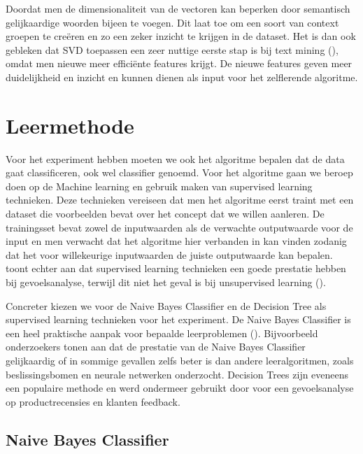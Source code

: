 Doordat men de dimensionaliteit van de vectoren kan beperken door semantisch gelijkaardige woorden bijeen te voegen. Dit laat toe om een soort van context groepen te cre\"eren en zo een zeker inzicht te krijgen in de dataset. Het is dan ook gebleken dat SVD toepassen een zeer nuttige eerste stap is bij text mining (\cite{maas2011learning}), omdat men nieuwe meer effici\"ente features krijgt. De nieuwe features geven meer duidelijkheid en inzicht en kunnen dienen als input voor het zelflerende algoritme.

\section{Leermethode}\label{Leermethode}

Voor het experiment hebben moeten we ook het algoritme bepalen dat de data gaat classificeren, ook wel classifier genoemd. Voor het algoritme gaan we beroep doen op de Machine learning en gebruik maken van supervised learning technieken. Deze technieken vereiseen dat men het algoritme eerst traint met een dataset die voorbeelden bevat over het concept dat we willen aanleren. De trainingsset bevat zowel de inputwaarden als de verwachte outputwaarde voor de input en men verwacht dat het algoritme hier verbanden in kan vinden zodanig dat het voor willekeurige inputwaarden de juiste outputwaarde kan bepalen. \cite{ye2009sentiment} toont echter aan dat supervised learning technieken een goede prestatie hebben bij gevoelsanalyse, terwijl dit niet het geval is bij unsupervised learning (\cite{rothfels2010unsupervised}).


Concreter kiezen we voor de Naive Bayes Classifier en de Decision Tree als supervised learning technieken voor het experiment. De Naive Bayes Classifier is een heel praktische aanpak voor bepaalde leerproblemen (\cite{mitchell1997machine}). Bijvoorbeeld onderzoekers \cite{Michie94machinelearning} tonen aan dat de prestatie van de Naive Bayes Classifier gelijkaardig of in sommige gevallen zelfs beter is dan andere leeralgoritmen, zoals beslissingsbomen en neurale netwerken onderzocht. Decision Trees zijn eveneens een populaire methode en werd ondermeer gebruikt door \cite{zhang2008sentiment} voor een gevoelsanalyse op productrecensies en klanten feedback.

\subsection{Naive Bayes Classifier}\label{Naive Bayes Classifier}

